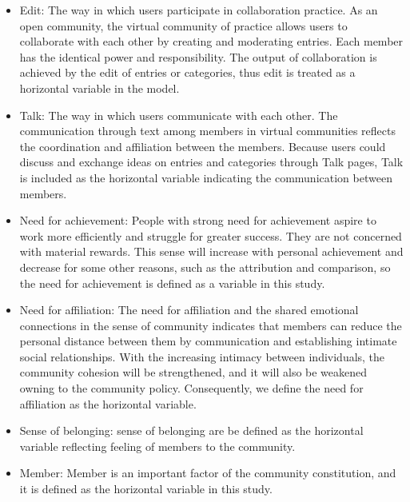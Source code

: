 \documentclass[doublespacing]{elsarticle}
\begin{document}
\begin{itemize}
\item  Edit: The way in which users participate in collaboration
  practice. As an open community, the virtual community of practice
  allows users to collaborate with each other by creating and
  moderating entries. Each member has the identical power and
  responsibility. The output of  collaboration is achieved by the edit
  of entries or categories, thus edit is treated as a horizontal
  variable in the model. 
\item Talk: The way in which users communicate with each other. The communication through text among members in virtual communities reflects the coordination and affiliation between the members. Because users could discuss and exchange ideas on entries and categories through Talk pages, Talk is included as the horizontal variable indicating the communication between members.  \item Need for achievement: People with strong need for achievement aspire to work more efficiently and struggle for greater success. They are not concerned with material rewards. This sense will increase with personal achievement and decrease for some other reasons, such as the attribution and comparison, so the need for achievement is defined as a variable in this study.
\item  Need for affiliation: The need for affiliation and the shared
emotional connections in the sense of community indicates that members
can reduce the personal distance between them by communication and
establishing intimate social relationships. With the increasing  intimacy between individuals, the community cohesion will be
strengthened, and it will also be weakened owning to the community
policy. Consequently, we define the need for affiliation as the
horizontal variable.  
\item Sense of belonging: sense of belonging are 
  be defined as the horizontal variable reflecting  feeling of
  members to
  the community.
\item  
 Member: Member is an important factor of the community constitution, and it is defined as the horizontal variable in this study.

\end{itemize}
 
\end{document}
